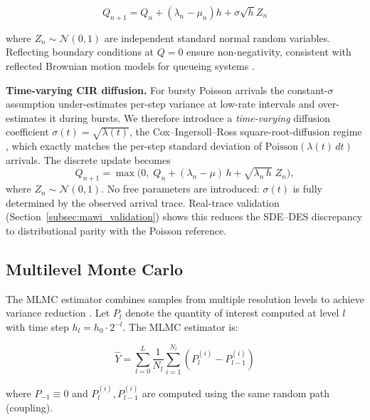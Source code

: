\documentclass{ieeeaccess}
\begin{document}
\begin{equation}
    Q_{n+1} = Q_n + (\lambda_n - \mu_n)h + \sigma\sqrt{h}Z_n
    \label{eq:euler}
\end{equation}

\noindent where $Z_n \sim \mathcal{N}(0,1)$ are independent standard normal random variables.
Reflecting boundary conditions at $Q=0$ ensure non-negativity, consistent with reflected Brownian
motion models for queueing systems \cite{harrison1985}.

\par\noindent\textbf{Time-varying CIR diffusion.}
For bursty Poisson arrivals the constant-$\sigma$ assumption under-estimates per-step variance at
low-rate intervals and over-estimates it during bursts. We therefore introduce a
\emph{time-varying} diffusion coefficient $\sigma(t)=\sqrt{\lambda(t)}$, the
Cox--Ingersoll--Ross square-root-diffusion regime \cite{kang2007}, which exactly matches the
per-step standard deviation of $\mathrm{Poisson}(\lambda(t)\,dt)$ arrivals. The discrete update
becomes
\begin{equation}
    Q_{n+1} = \max\!\bigl(0,\; Q_n + (\lambda_n - \mu)\,h + \sqrt{\lambda_n\,h}\;Z_n\bigr),
    \label{eq:tv_sigma}
\end{equation}
where $Z_n \sim \mathcal{N}(0,1)$.  No free parameters are introduced: $\sigma(t)$ is fully
determined by the observed arrival trace. Real-trace validation
(Section~\ref{subsec:mawi_validation}) shows this reduces the SDE--DES discrepancy to
distributional parity with the Poisson reference.

\subsection{Multilevel Monte Carlo}

The MLMC estimator combines samples from multiple resolution levels to achieve variance reduction
\cite{giles2008multilevel, giles2015multilevel}. Let $P_l$ denote the quantity of interest
computed at level $l$ with time step $h_l = h_0 \cdot 2^{-l}$. The MLMC estimator is:

\begin{equation}
    \hat{Y} = \sum_{l=0}^{L} \frac{1}{N_l} \sum_{i=1}^{N_l} (P_l^{(i)} - P_{l-1}^{(i)})
    \label{eq:mlmc}
\end{equation}

\noindent where $P_{-1} \equiv 0$ and $P_l^{(i)}, P_{l-1}^{(i)}$ are computed using the same
random path (coupling).
\end{document}
